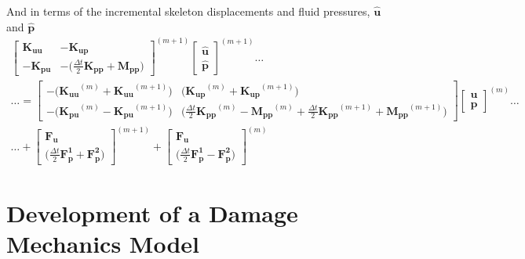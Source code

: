 \documentclass[11pt]{article} %
\begin{document}
And in terms of the incremental skeleton displacements and fluid pressures, $\hat{\mathbf{u}}$ and $\hat{\mathbf{p}}$
\begin{eqnarray}
	\left[
	\begin{array}{cc}
		\mathbf{K_{uu}} & -\mathbf{K_{up}} \\
		-\mathbf{K_{pu}} & -\bigg( \frac{\Delta t}{2} \mathbf{K_{pp}} + \mathbf{M_{pp}} \bigg)
	\end{array} \right] ^{(m+1)}
	\left[
	\begin{array}{c}
		\hat{\mathbf{u}} \\
		\hat{\mathbf{p}}
	\end{array} \right] ^{(m+1)} \ldots \qquad \qquad \qquad \qquad \qquad \qquad \nonumber \\
	\ldots = \left[
	\begin{array}{cc}
		-\bigg(\mathbf{K_{uu}}^{(m)} + \mathbf{K_{uu}}^{(m+1)} \bigg) & \bigg(\mathbf{K_{up}}^{(m)} + \mathbf{K_{up}}^{(m+1)} \bigg) \\
		-\bigg(\mathbf{K_{pu}}^{(m)} - \mathbf{K_{pu}}^{(m+1)} \bigg) & \bigg( \frac{\Delta t}{2} \mathbf{K_{pp}}^{(m)} - \mathbf{M_{pp}} ^{(m)} + \frac{\Delta t}{2} \mathbf{K_{pp}} ^{(m+1)} + \mathbf{M_{pp}} ^{(m+1)} \bigg)
	\end{array} \right]
	\left[
	\begin{array}{c}
		\mathbf{u} \\
		\mathbf{p}
	\end{array} \right] ^{(m)} \ldots \nonumber \\
	\ldots + \left[
	\begin{array}{c}
		\mathbf{F_u} \\
		 \bigg( \frac{\Delta t}{2} \mathbf{F^1_{p}} + \mathbf{F^2_{p}} \bigg)
	\end{array} \right] ^{(m+1)} +
	\left[
	\begin{array}{c}
		\mathbf{F_u} \\
		 \bigg( \frac{\Delta t}{2} \mathbf{F^1_{p}} - \mathbf{F^2_{p}} \bigg)
	\end{array} \right] ^{(m)} \qquad \qquad \qquad \qquad \qquad \qquad \qquad \nonumber
	\label{eq:matrixequations}
\end{eqnarray}

\section{Development of a Damage Mechanics Model}
\end{document}
